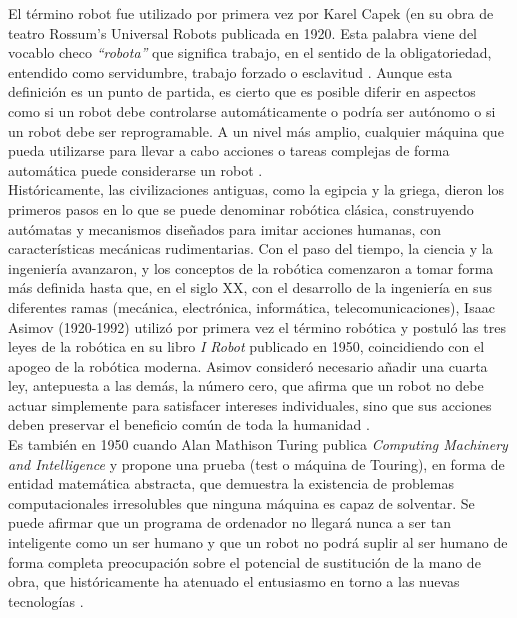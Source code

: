 El término robot fue utilizado por primera vez por Karel Capek (en su obra de teatro Rossum’s Universal Robots publicada en 1920. Esta palabra viene del vocablo checo \textit{“robota”} que significa trabajo, en el sentido de la obligatoriedad, entendido como servidumbre, trabajo forzado o esclavitud \cite{Sanchez07a}. Aunque esta definición es un punto de partida, es cierto que es posible diferir en aspectos como si un robot debe controlarse automáticamente o podría ser autónomo o si un robot debe ser reprogramable. A un nivel más amplio, cualquier máquina que pueda utilizarse para llevar a cabo acciones o tareas complejas de forma automática puede considerarse un robot \cite{Raj19}.\\

Históricamente, las civilizaciones antiguas, como la egipcia y la griega, dieron los primeros pasos en lo que se puede denominar robótica clásica, construyendo autómatas y mecanismos diseñados para imitar acciones humanas, con características mecánicas rudimentarias. 
Con el paso del tiempo, la ciencia y la ingeniería avanzaron, y los conceptos de la robótica comenzaron a tomar forma más definida hasta que, en el siglo XX, con el desarrollo de la ingeniería en sus diferentes ramas (mecánica, electrónica, informática, telecomunicaciones), Isaac Asimov (1920-1992) utilizó por primera vez el término robótica y postuló las tres leyes de la robótica en su libro \textit{I Robot} publicado en 1950, coincidiendo con el apogeo de la robótica moderna. Asimov consideró necesario añadir una cuarta ley, antepuesta a las demás, la número cero, que afirma que un robot no debe actuar simplemente para satisfacer intereses individuales, sino que sus acciones deben preservar el beneficio común de toda la humanidad \cite{Sanchez07b}.\\

Es también en 1950 cuando Alan Mathison Turing publica \textit{Computing Machinery and Intelligence} y propone una prueba (test o máquina de Touring), en forma de entidad matemática abstracta, que demuestra la existencia de problemas computacionales irresolubles que ninguna máquina es capaz de solventar. Se puede afirmar que un programa de ordenador no llegará nunca a ser tan inteligente como un ser humano y que un robot no podrá suplir al ser humano de forma completa \cite{Sanchez07b} preocupación sobre el potencial de sustitución de la mano de obra, que históricamente ha atenuado el entusiasmo en torno a las nuevas tecnologías \cite{Mokyr15}.\\

